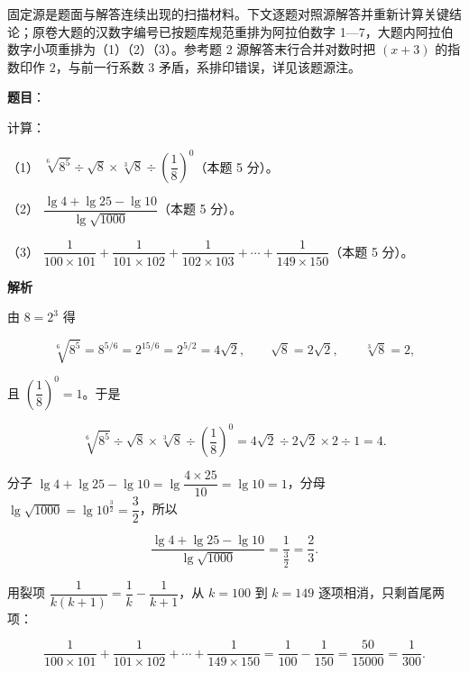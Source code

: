 

\begin{gktip}
固定源是题面与解答连续出现的扫描材料。下文逐题对照源解答并重新计算关键结论；原卷大题的汉数字编号已按题库规范重排为阿拉伯数字 1—7，大题内阿拉伯数字小项重排为（1）（2）（3）。参考题 2 源解答末行合并对数时把 $(x+3)$ 的指数印作 $2$，与前一行系数 $3$ 矛盾，系排印错误，详见该题源注。
\end{gktip}

\begin{answer}

\textbf{题目}：

计算：

（1） $\sqrt[6]{8^5}\div\sqrt{8}\times\sqrt[3]{8}\div\left(\dfrac18\right)^0$（本题 5 分）。

（2） $\dfrac{\lg 4+\lg 25-\lg 10}{\lg\sqrt{1000}}$（本题 5 分）。

（3） $\dfrac{1}{100\times101}+\dfrac{1}{101\times102}+\dfrac{1}{102\times103}+\cdots+\dfrac{1}{149\times150}$（本题 5 分）。

\textbf{解析}


由 $8=2^3$ 得

\nopagebreak[4]
\[
\sqrt[6]{8^5}=8^{5/6}=2^{15/6}=2^{5/2}=4\sqrt2,
\qquad
\sqrt8=2\sqrt2,
\qquad
\sqrt[3]{8}=2,
\]

且 $\left(\dfrac18\right)^0=1$。于是

\nopagebreak[4]
\[
\sqrt[6]{8^5}\div\sqrt8\times\sqrt[3]{8}\div\left(\frac18\right)^0
=4\sqrt2\div2\sqrt2\times2\div1=4.
\]


分子 $\lg4+\lg25-\lg10=\lg\dfrac{4\times25}{10}=\lg10=1$，分母 $\lg\sqrt{1000}=\lg10^{\frac32}=\dfrac32$，所以

\nopagebreak[4]
\[
\frac{\lg4+\lg25-\lg10}{\lg\sqrt{1000}}=\frac{1}{\frac32}=\frac23.
\]


用裂项 $\dfrac{1}{k(k+1)}=\dfrac1k-\dfrac{1}{k+1}$，从 $k=100$ 到 $k=149$ 逐项相消，只剩首尾两项：

\nopagebreak[4]
\[
\frac{1}{100\times101}+\frac{1}{101\times102}+\cdots+\frac{1}{149\times150}
=\frac1{100}-\frac1{150}
=\frac{50}{15000}=\frac1{300}.
\]




\end{answer}
